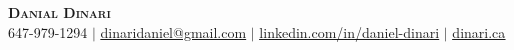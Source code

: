 \begin{center}
    \textbf{\Huge \scshape Danial Dinari} \\ \vspace{1pt}
    \small 647-979-1294 $|$ \href{mailto:dinaridaniel@gmail.com}{\underline{dinaridaniel@gmail.com}} $|$ 
    \href{https://www.linkedin.com/in/daniel-dinari/}{\underline{linkedin.com/in/daniel-dinari}} $|$
    \href{https://dinari.ca/}{\underline{dinari.ca}}
\end{center}